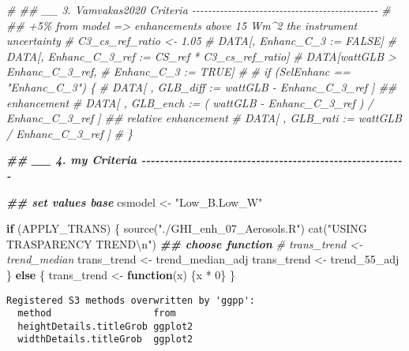 \documentclass[
  10pt,
  a4paper,oneside]{article}
\newenvironment{Shaded}{\begin{snugshade}}{\end{snugshade}}
\newcommand{\CommentTok}[1]{\textcolor[rgb]{0.56,0.35,0.01}{\textit{#1}}}
\newcommand{\ControlFlowTok}[1]{\textcolor[rgb]{0.13,0.29,0.53}{\textbf{#1}}}
\newcommand{\DecValTok}[1]{\textcolor[rgb]{0.00,0.00,0.81}{#1}}
\newcommand{\DocumentationTok}[1]{\textcolor[rgb]{0.56,0.35,0.01}{\textbf{\textit{#1}}}}
\newcommand{\FunctionTok}[1]{\textcolor[rgb]{0.00,0.00,0.00}{#1}}
\newcommand{\NormalTok}[1]{#1}
\newcommand{\OtherTok}[1]{\textcolor[rgb]{0.56,0.35,0.01}{#1}}
\newcommand{\SpecialCharTok}[1]{\textcolor[rgb]{0.00,0.00,0.00}{#1}}
\newcommand{\StringTok}[1]{\textcolor[rgb]{0.31,0.60,0.02}{#1}}
\begin{document}
\begin{Shaded}
\begin{Highlighting}[]
\CommentTok{\# \#\# \_\_ 3. Vamvakas2020  Criteria  {-}{-}{-}{-}{-}{-}{-}{-}{-}{-}{-}{-}{-}{-}{-}{-}{-}{-}{-}{-}{-}{-}{-}{-}{-}{-}{-}{-}{-}{-}{-}{-}{-}{-}{-}{-}{-}{-}{-}{-}{-}{-}{-}{-}{-}{-}{-}}
\CommentTok{\# \#\# +5\% from model =\textgreater{} enhancements above 15 Wm\^{}2 the instrument uncertainty}
\CommentTok{\# C3\_cs\_ref\_ratio \textless{}{-} 1.05}
\CommentTok{\# DATA[, Enhanc\_C\_3 := FALSE]}
\CommentTok{\# DATA[, Enhanc\_C\_3\_ref := CS\_ref * C3\_cs\_ref\_ratio]}
\CommentTok{\# DATA[wattGLB \textgreater{} Enhanc\_C\_3\_ref,}
\CommentTok{\#      Enhanc\_C\_3 := TRUE]}
\CommentTok{\#}
\CommentTok{\# if (SelEnhanc == "Enhanc\_C\_3") \{}
\CommentTok{\#   DATA[ , GLB\_diff :=   wattGLB {-} Enhanc\_C\_3\_ref                    ] \#\# enhancement}
\CommentTok{\#   DATA[ , GLB\_ench := ( wattGLB {-} Enhanc\_C\_3\_ref ) / Enhanc\_C\_3\_ref ] \#\# relative enhancement}
\CommentTok{\#   DATA[ , GLB\_rati :=   wattGLB / Enhanc\_C\_3\_ref                    ]}
\CommentTok{\# \}}



\DocumentationTok{\#\# \_\_ 4. my Criteria  {-}{-}{-}{-}{-}{-}{-}{-}{-}{-}{-}{-}{-}{-}{-}{-}{-}{-}{-}{-}{-}{-}{-}{-}{-}{-}{-}{-}{-}{-}{-}{-}{-}{-}{-}{-}{-}{-}{-}{-}{-}{-}{-}{-}{-}{-}{-}{-}{-}{-}{-}{-}{-}{-}{-}{-}{-}{-}}

\DocumentationTok{\#\# set values base}
\NormalTok{csmodel }\OtherTok{\textless{}{-}} \StringTok{"Low\_B.Low\_W"}



\ControlFlowTok{if}\NormalTok{ (APPLY\_TRANS) \{}
  \FunctionTok{source}\NormalTok{(}\StringTok{"./GHI\_enh\_07\_Aerosols.R"}\NormalTok{)}
  \FunctionTok{cat}\NormalTok{(}\StringTok{"USING TRASPARENCY TREND}\SpecialCharTok{\textbackslash{}n}\StringTok{"}\NormalTok{)}
  \DocumentationTok{\#\# choose function}
  \CommentTok{\# trans\_trend \textless{}{-} trend\_median}
\NormalTok{  trans\_trend }\OtherTok{\textless{}{-}}\NormalTok{ trend\_median\_adj}
\NormalTok{  trans\_trend }\OtherTok{\textless{}{-}}\NormalTok{ trend\_55\_adj}
\NormalTok{\} }\ControlFlowTok{else}\NormalTok{ \{}
\NormalTok{  trans\_trend }\OtherTok{\textless{}{-}} \ControlFlowTok{function}\NormalTok{(x) \{x }\SpecialCharTok{*} \DecValTok{0}\NormalTok{\}}
\NormalTok{\}}
\end{Highlighting}
\end{Shaded}

\begin{verbatim}
Registered S3 methods overwritten by 'ggpp':
  method                  from   
  heightDetails.titleGrob ggplot2
  widthDetails.titleGrob  ggplot2
\end{verbatim}
\end{document}
